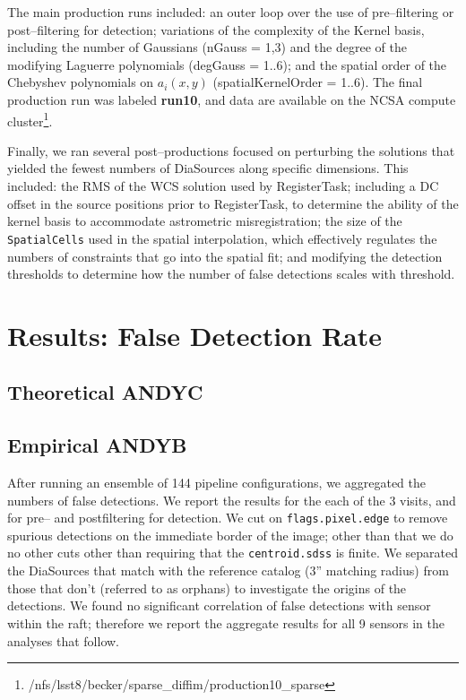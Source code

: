 \documentclass[prd, nofootinbib, floatfix, 11pt,tightenlines,times]{article}
\begin{document}
The main production runs included: an outer loop over the use of
pre--filtering or post--filtering for detection; variations of the
complexity of the Kernel basis, including the number of Gaussians
(nGauss = 1,3) and the degree of the modifying Laguerre polynomials
(degGauss = 1..6); and the spatial order of the Chebyshev polynomials
on $a_i(x,y)$ (spatialKernelOrder = 1..6).  The final production run
was labeled {\bf run10}, and data are available on the NCSA compute
cluster\footnote{/nfs/lsst8/becker/sparse\_diffim/production10\_sparse}.

Finally, we ran several post--productions focused on perturbing the
solutions that yielded the fewest numbers of DiaSources along specific
dimensions.  This included: the RMS of the WCS solution used by
RegisterTask; including a DC offset in the source positions prior to
RegisterTask, to determine the ability of the kernel basis to
accommodate astrometric misregistration; the size of the {\tt
  SpatialCells} used in the spatial interpolation, which effectively
regulates the numbers of constraints that go into the spatial fit; and
modifying the detection thresholds to determine how the number of
false detections scales with threshold.


\section{Results: False Detection Rate}

\subsection{Theoretical {\bf ANDYC}\label{sec-analyticfp}}

\subsection{Empirical {\bf ANDYB}}

After running an ensemble of 144 pipeline configurations, we
aggregated the numbers of false detections.  We report the results for
the each of the 3 visits, and for pre-- and postfiltering for
detection.  We cut on {\tt flags.pixel.edge} to remove spurious
detections on the immediate border of the image; other than that we do
no other cuts other than requiring that the {\tt centroid.sdss} is
finite.  We separated the DiaSources that match with the reference
catalog (3'' matching radius) from those that don't (referred to as
orphans) to investigate the origins of the detections.  We found no
significant correlation of false detections with sensor within the
raft; therefore we report the aggregate results for all 9 sensors in
the analyses that follow.
\end{document}
